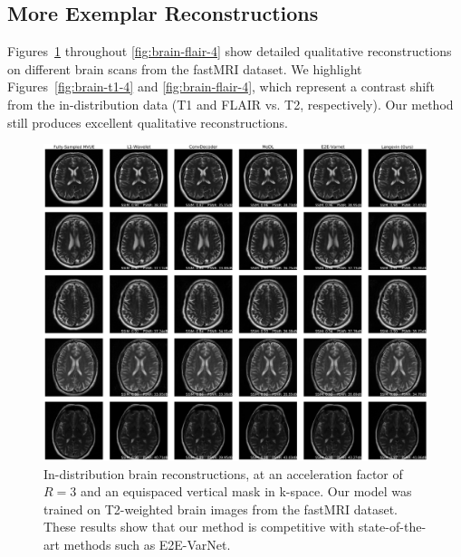 \documentclass{article}
\begin{document}
\subsection{More Exemplar Reconstructions}
Figures~\ref{fig:brain-in-3} throughout \ref{fig:brain-flair-4} show detailed qualitative reconstructions on different brain scans from the fastMRI dataset. We highlight Figures~\ref{fig:brain-t1-4} and \ref{fig:brain-flair-4}, which represent a contrast shift from the in-distribution data (T1 and FLAIR vs. T2, respectively). Our method still produces excellent qualitative reconstructions.

\begin{figure}
    \centering
    \includegraphics[width=\columnwidth]{brain-equispaced-vertical-R=3-comp.pdf}
    \caption{ In-distribution brain reconstructions, at an acceleration factor of $R=3$ and an equispaced vertical mask in k-space. Our model was trained on T2-weighted brain images from the fastMRI dataset. These results show that our method is competitive with state-of-the-art methods such as E2E-VarNet.}
    \label{fig:brain-in-3}
\end{figure}
\end{document}
